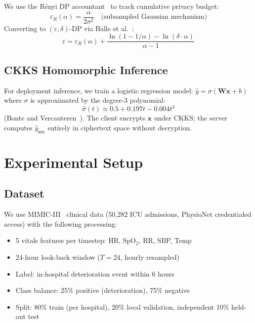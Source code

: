 \documentclass[10pt,journal,compsoc]{IEEEtran}
\begin{document}
We use the Rényi DP accountant~\cite{mironov2017renyi} to track
cumulative privacy budget:
\begin{equation}
\varepsilon_R(\alpha) = \frac{\alpha}{2\sigma^2}
\quad \text{(subsampled Gaussian mechanism)}
\end{equation}
Converting to $(\varepsilon, \delta)$-DP via Balle et
al.~\cite{balle2020hypothesis}:
\begin{equation}
\varepsilon = \varepsilon_R(\alpha) +
  \frac{\ln(1 - 1/\alpha) - \ln(\delta \cdot \alpha)}{\alpha - 1}
\end{equation}

\subsection{CKKS Homomorphic Inference}

For deployment inference, we train a logistic regression model:
$\hat{y} = \sigma(\mathbf{W}\mathbf{x} + b)$
where $\sigma$ is approximated by the degree-3 polynomial:
\begin{equation}
\hat{\sigma}(t) \approx 0.5 + 0.197t - 0.004t^3
\end{equation}
(Bonte and Vercauteren~\cite{bonte2018privacy}).
The client encrypts $\mathbf{x}$ under CKKS; the server computes
$\hat{y}_\mathsf{enc}$ entirely in ciphertext space without
decryption.

\section{Experimental Setup}
\label{sec:setup}

\subsection{Dataset}

We use MIMIC-III~\cite{johnson2016mimic} clinical data
(50,282 ICU admissions, PhysioNet credentialed access) with
the following processing:
\begin{itemize}
\item 5 vitals features per timestep: HR, SpO$_2$, RR, SBP, Temp
\item 24-hour look-back window ($T=24$, hourly resampled)
\item Label: in-hospital deterioration event within 6 hours
\item Class balance: 25\% positive (deterioration), 75\% negative
\item Split: 80\% train (per hospital), 20\% local validation,
  independent 10\% held-out test
\end{itemize}
\end{document}
